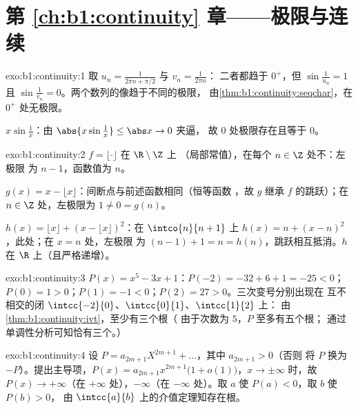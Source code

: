 \section*{第 \ref{ch:b1:continuity} 章——极限与连续}

\begin{solution}{exo:b1:continuity:1}
取 $u_n = \frac{1}{2\pi n + \pi/2}$ 与 $v_n = \frac{1}{2\pi n}$：
二者都趋于 $0^+$，但 $\sin\frac{1}{u_n} = 1$ 且
$\sin\frac{1}{v_n} = 0$。两个数列的像趋于不同的极限，
由\cref{thm:b1:continuity:seqchar}，在 $0^+$ 处无极限。

$x \sin\frac1x$：由 $\abs{x\sin\frac1x} \leq \abs x \to 0$ 夹逼，
故 $0$ 处极限存在且等于 $0$。
\end{solution}

\begin{solution}{exo:b1:continuity:2}
$f = \lfloor\cdot\rfloor$ 在 $\R \setminus \Z$ 上
（局部常值），在每个 $n \in \Z$ 处不：左极限
为 $n - 1$，函数值为 $n$。

$g(x) = x - \lfloor x\rfloor$：间断点与前述函数相同（恒等函数
，故 $g$ 继承 $f$ 的跳跃）；在 $n \in
\Z$ 处，左极限为 $1 \neq 0 = g(n)$。

$h(x) = \lfloor x\rfloor + (x - \lfloor x\rfloor)^2$：在 $\intco{n}{n
+ 1}$ 上 $h(x) = n + (x - n)^2$，此处；在 $x = n$ 处，左极限
为 $(n-1) + 1 = n = h(n)$，跳跃相互抵消。$h$ 在
$\R$ 上（且严格递增）。
\end{solution}

\begin{solution}{exo:b1:continuity:3}
$P(x) = x^5 - 3x + 1$：$P(-2) = -32 + 6 + 1 = -25 < 0$；$P(0) = 1 >
0$；$P(1) = -1 < 0$；$P(2) = 27 > 0$。三次变号分别出现在
互不相交的闭 $\intcc{-2}{0}$、$\intcc{0}{1}$、$\intcc{1}{2}$ 上：
由\cref{thm:b1:continuity:ivt}，至少有三个根（
由于次数为 $5$，$P$ 至多有五个根；
通过单调性分析可知恰有三个。）
\end{solution}

\begin{solution}{exo:b1:continuity:4}
设 $P = a_{2m+1}X^{2m+1} + \dots$，其中 $a_{2m+1} > 0$（否则
将 $P$ 换为 $-P$）。提出主导项，$P(x) = a_{2m+1}
x^{2m+1}\bigl(1 + o(1)\bigr)$，$x \to \pm\infty$ 时，故 $P(x) \to
+\infty$（在 $+\infty$ 处），$-\infty$（在 $-\infty$ 处）。取 $a$ 使
$P(a) < 0$，取 $b$ 使 $P(b) > 0$，
由 $\intcc{a}{b}$ 上的介值定理知存在根。
\end{solution}

